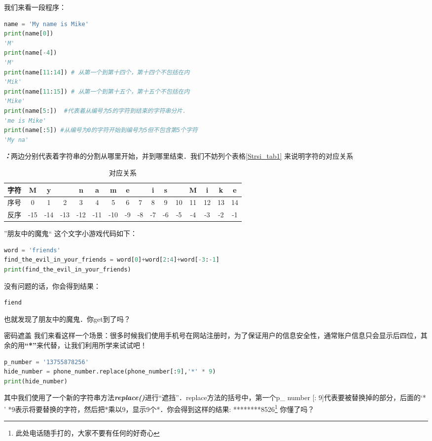 我们来看一段程序：
\begin{lstlisting}[language=python]
name = 'My name is Mike'
print(name[0])
'M'
print(name[-4])
'M'
print(name[11:14]) # 从第一个到第十四个，第十四个不包括在内
'Mik'
print(name[11:15]) # 从第一个到第十五个，第十五个不包括在内
'Mike'
print(name[5:])  #代表着从编号为5的字符到结束的字符串分片．
'me is Mike'
print(name[:5]) #从编号为0的字符开始到编号为5但不包含第5个字符
'My na'
\end{lstlisting}
\textbf{\textsl{：}}两边分别代表着字符串的分割从哪里开始，并到哪里结束．我们不妨列个表格\autoref{Strsi_tab1} 来说明字符的对应关系
\begin{table}[ht]
\centering
\caption{对应关系}\label{Strsi_tab1}
\begin{tabular}{|c|c|c|c|c|c|c|c|c|c|c|c|c|c|c|c|}
\hline
 字符  & M & y &   & n & a & m & e &   & i & s &   & M & i & k &e\\
\hline
 序号  & 0 & 1 & 2 & 3 & 4 & 5 & 6 & 7 & 8 & 9 & 10 & 11 & 12 & 13 & 14\\
\hline
 反序  & -15 & -14 & -13 & -12 & -11 & -10 & -9 & -8 & -7 & -6 & -5 & -4 & -3 & -2 & -1\\
\hline
\end{tabular}
\end{table}
\begin{example}{”朋友中的魔鬼“}
这个文字小游戏代码如下：
\begin{lstlisting}[language=python]
word = 'friends'
find_the_evil_in_your_friends = word[0]+word[2:4]+word[-3:-1] 
print(find_the_evil_in_your_friends)
\end{lstlisting}
没有问题的话，你会得到结果：
\begin{lstlisting}[language=python]
fiend
\end{lstlisting}
也就发现了朋友中的魔鬼．你get到了吗？
\end{example}
\begin{example}{密码遮盖}
我们来看这样一个场景：很多时候我们使用手机号在网站注册时，为了保证用户的信息安全性，通常账户信息只会显示后四位，其余的用\textbf{“*”}来代替，让我们利用所学来试试吧！
\begin{lstlisting}[language=python]
p_number = '13755878256'
hide_number = phone_number.replace(phone_number[:9],'*' * 9)
print(hide_number)
\end{lstlisting}
其中我们使用了一个新的字符串方法\textbf{\textsl{replace()}}进行“遮挡”．replace方法的括号中，第一个p_ number [: 9]代表要被替换掉的部分，后面的‘* ' *9表示将要替换的字符，然后把*乘以9，显示9个*．你会得到这样的结果: ********8526\footnote{此处电话随手打的，大家不要有任何的好奇心}
你懂了吗？

\end{example}

